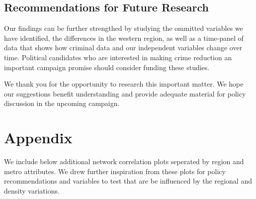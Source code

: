 \documentclass[]{article}
\newenvironment{Shaded}{}{}
\newcommand{\CommentTok}[1]{\textcolor[rgb]{0.00,0.50,0.00}{#1}}
\newcommand{\DataTypeTok}[1]{#1}
\newcommand{\DecValTok}[1]{#1}
\newcommand{\KeywordTok}[1]{\textcolor[rgb]{0.00,0.00,1.00}{#1}}
\newcommand{\NormalTok}[1]{#1}
\newcommand{\OperatorTok}[1]{#1}
\newcommand{\StringTok}[1]{\textcolor[rgb]{0.00,0.50,0.50}{#1}}
\begin{document}
\hypertarget{recommendations-for-future-research}{%
\subsection{Recommendations for Future
Research}\label{recommendations-for-future-research}}

Our findings can be further strengthed by studying the ommitted
variables we have identified, the differences in the western region, as
well as a time-panel of data that shows how criminal data and our
independent variables change over time. Political candidates who are
interested in making crime reduction an important campaign promise
should consider funding these studies.

We thank you for the opportunity to research this important matter. We
hope our suggestions benefit understanding and provide adequate material
for policy discussion in the upcoming campaign.

\hypertarget{appendix}{%
\section{Appendix}\label{appendix}}

We include below additional network correlation plots seperated by
region and metro attributes. We drew further inspiration from these
plots for policy recommendations and variables to test that are be
influenced by the regional and density variations.

\begin{Shaded}
\end{Shaded}
\end{document}
